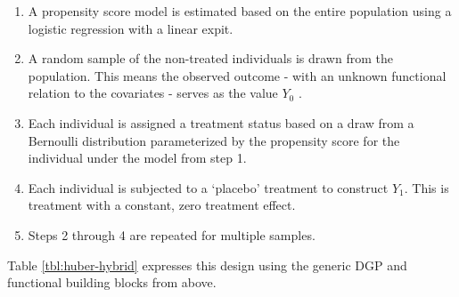 \documentclass[../main.tex]{subfiles}
\begin{document}
\vspace{\baselineskip}
\begin{enumerate}
	\item A propensity score model is estimated based on the entire population using a logistic regression with a linear expit.\par

	\item A random sample of the non-treated individuals is drawn from the population. This means the observed outcome - with an unknown functional relation to the covariates - serves as the value  \( Y_{0} \) .\par

	\item Each individual is assigned a treatment status based on a draw from a Bernoulli distribution parameterized by the propensity score for the individual under the model from step 1.\par

	\item Each individual is subjected to a ‘placebo’ treatment to construct  \( Y_{1}. \) This is treatment with a constant, zero treatment effect.\par

	\item Steps 2 through 4 are repeated for multiple samples.
\end{enumerate}\par


\vspace{\baselineskip}
Table \ref{tbl:huber-hybrid} expresses this design using the generic DGP and functional building blocks from above.\par


\vspace{\baselineskip}


\end{document}
